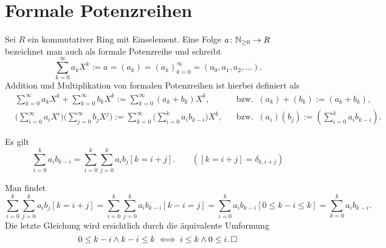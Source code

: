 \newpage
\section{Formale Potenzreihen}

\begin{Definition}\newlinefirst
Sei $R$ ein kommutativer Ring mit Einselement. Eine Folge
$a\colon\mathbb N_{\ge 0}\to R$ bezeichnet man auch als formale Potenzreihe
und schreibt
\[\sum_{k=0}^\infty a_k X^k := a = (a_k) = (a_k)_{k=0}^\infty
= (a_0,a_1,a_2,\ldots).\]
Addition und Multiplikation von formalen Potenzreihen ist hierbei
definiert als
\begin{align*}
& \sum_{k=0}^\infty a_k X^k + \sum_{k=0}^\infty b_k X^k
:= \sum_{k=0}^\infty (a_k + b_k)X^k, && \text{bzw.}\;\;(a_k) + (b_k) := (a_k + b_k),\\
& \bigg(\sum_{i=0}^\infty a_i X^i\bigg)\bigg(\sum_{j=0}^\infty b_j X^j\bigg)
:= \sum_{k=0}^\infty \bigg(\sum_{i=0}^k a_i b_{k-i}\bigg)X^k,
&& \text{bzw.}\;\;(a_i)(b_j) := ({\textstyle\sum_{i=0}^k a_i b_{k-i}}).
\end{align*}
\end{Definition}

\begin{Satz} Es gilt
\[\sum_{i=0}^k a_i b_{k-i} = \sum_{i=0}^k\sum_{j=0}^k a_i b_j [k=i+j].\qquad ([k=i+j]=\delta_{k,i+j})\]
\end{Satz}
\begin{Beweis} Man findet
\[\sum_{i=0}^k\sum_{j=0}^k a_i b_j [k{=}i{+}j]
= \sum_{i=0}^k\sum_{j=0}^k a_i b_{k-i} [k{-}i{=}j]
= \sum_{i=0}^k a_i b_{k-i} [0{\le}k{-}i{\le}k]
= \sum_{k=0}^k a_i b_{k-i}.\]
Die letzte Gleichung wird ersichtlich durch die äquivalente Umformung
\[0\le k-i\land k-i\le k\iff i\le k\land 0\le i.\,\square\]
\end{Beweis}

